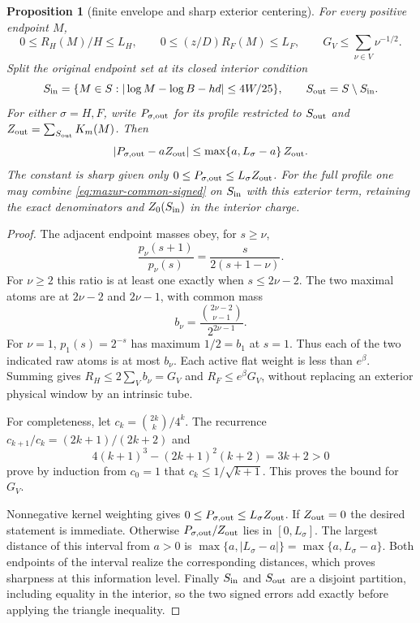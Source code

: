 \documentclass[11pt]{article}
\newtheorem{proposition}{Proposition}
\theoremstyle{remark}\newtheorem{remark}[proposition]{Remark}
\begin{document}
\begin{proposition}[finite envelope and sharp exterior centering]
\label{prop:mazur-profile-envelope}
For every positive endpoint $M$,
\[
 0\le R_H(M)/H\le L_H,\qquad
 0\le(z/D)R_F(M)\le L_F,\qquad
 G_V\le\sum_{\nu\in V}\nu^{-1/2}.
\]
Split the original endpoint set at its closed interior condition
\[
 S_{\rm in}=\{M\in S:
  |\log M-\log B-hd|\le4W/25\},\qquad
 S_{\rm out}=S\setminus S_{\rm in}.
\]
For either $\sigma=H,F$, write $P_{\sigma,\rm out}$ for its
profile restricted to $S_{\rm out}$ and
$Z_{\rm out}=\sum_{S_{\rm out}}K_m(M)$. Then
\begin{equation}
 |P_{\sigma,\rm out}-aZ_{\rm out}|
 \le\max\{a,L_\sigma-a\}\,Z_{\rm out}.
 \label{eq:mazur-sharp-exterior}
\end{equation}
The constant is sharp given only $0\le P_{\sigma,\rm out}
\le L_\sigma Z_{\rm out}$.
For the full profile one may combine
\eqref{eq:mazur-common-signed} on $S_{\rm in}$ with this
exterior term, retaining the exact denominators and
$Z_0(S_{\rm in})$ in the interior charge.
\end{proposition}
\begin{proof}
The adjacent endpoint masses obey, for $s\ge\nu$,
\[
 \frac{p_\nu(s+1)}{p_\nu(s)}
      =\frac{s}{2(s+1-\nu)}.
\]
For $\nu\ge2$ this ratio is at least one exactly when
$s\le2\nu-2$. The two maximal atoms are at $2\nu-2$ and
$2\nu-1$, with common mass
\[
 b_\nu=\frac{\binom{2\nu-2}{\nu-1}}{2^{2\nu-1}}.
\]
For $\nu=1$, $p_1(s)=2^{-s}$ has maximum $1/2=b_1$
at $s=1$. Thus each of the two indicated raw atoms is at most
$b_\nu$. Each active flat weight is less than $e^\beta$.
Summing gives $R_H\le2\sum_Vb_\nu=G_V$ and
$R_F\le e^\beta G_V$, without replacing an exterior physical
window by an intrinsic tube.

For completeness, let $c_k=\binom{2k}{k}/4^k$.
The recurrence $c_{k+1}/c_k=(2k+1)/(2k+2)$ and
\[
 4(k+1)^3-(2k+1)^2(k+2)=3k+2>0
\]
prove by induction from $c_0=1$ that
$c_k\le1/\sqrt{k+1}$. This proves the bound for $G_V$.

Nonnegative kernel weighting gives
$0\le P_{\sigma,\rm out}\le L_\sigma Z_{\rm out}$.
If $Z_{\rm out}=0$ the desired statement is immediate.
Otherwise $P_{\sigma,\rm out}/Z_{\rm out}$ lies in $[0,L_\sigma]$.
The largest distance of this interval from $a>0$ is
$\max\{a,|L_\sigma-a|\}=\max\{a,L_\sigma-a\}$.
Both endpoints of the interval realize the corresponding distances,
which proves sharpness at this information level.
Finally $S_{\rm in}$ and $S_{\rm out}$ are a disjoint partition,
including equality in the interior, so the two signed errors add
exactly before applying the triangle inequality.
\end{proof}
\end{document}
